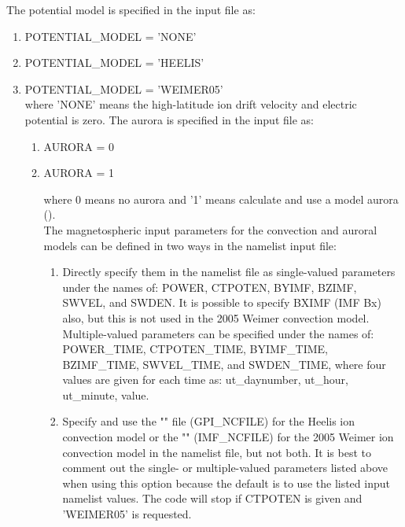 The potential model is specified in the input file as:
%
\begin{enumerate}
\item POTENTIAL_MODEL = 'NONE'
\item POTENTIAL_MODEL = 'HEELIS'
\item POTENTIAL_MODEL = 'WEIMER05' \\

where 'NONE' means the high-latitude ion drift velocity and electric potential
is zero.  The aurora is specified in the input file as:
%
\begin{enumerate}
\item AURORA = 0
\item AURORA = 1

where 0 means no aurora and '1' means calculate and use a model aurora
(\cite{roble1987}). \\

The magnetospheric input parameters for the convection and auroral models
can be defined in two ways in the namelist input file:
%
\begin{enumerate}
\item Directly specify them in the namelist file as single-valued
parameters under the names of: POWER, CTPOTEN, BYIMF, BZIMF, SWVEL, and SWDEN.
It is possible to specify BXIMF (IMF Bx) also, but this is not used in the
2005 Weimer convection model.  Multiple-valued parameters can be specified
under the names of: POWER_TIME, CTPOTEN_TIME, BYIMF_TIME, BZIMF_TIME,
SWVEL_TIME, and SWDEN_TIME, where four values are given for each
time as: ut_daynumber, ut_hour, ut_minute, value.
\item Specify and use the "" file (GPI_NCFILE) for the
Heelis ion convection model or the "" (IMF_NCFILE) for
the 2005 Weimer ion convection model in the namelist file, but not both.
It is best to comment out the single- or multiple-valued parameters listed
above when using this option because the default is to use the listed
input namelist values.  The code will stop if CTPOTEN is given and
'WEIMER05' is requested.


\end{enumerate}
\end{enumerate}
\end{enumerate}
